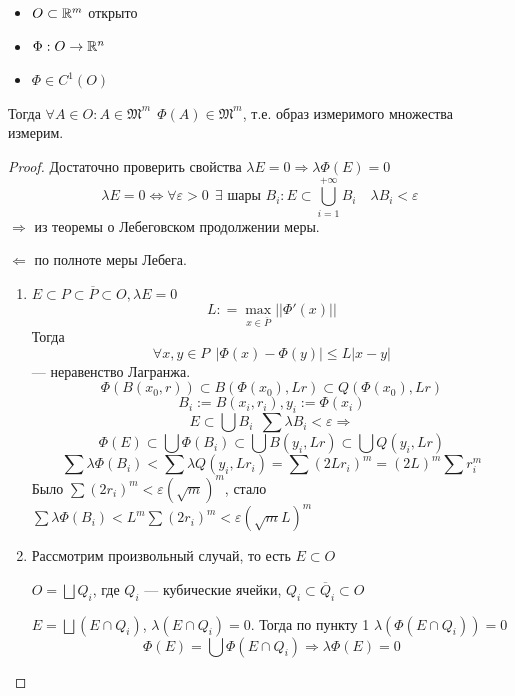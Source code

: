 \begin{theorem}\itemfix
    \begin{itemize}
        \item \(O\subset \mathbb{R}^m\) открыто
        \item \(\Phi: O \to \mathbb{R}^n\)
        \item \(\Phi\in C^1(O)\)
    \end{itemize}
    Тогда \(\forall A\in O : A \in \mathfrak{M}^m \ \ \Phi(A)\in \mathfrak{M}^m\), т.е. образ измеримого множества измерим.
\end{theorem}
\begin{proof}
    Достаточно проверить свойства \(\lambda E = 0 \Rightarrow \lambda \Phi(E) = 0\)
    \[\lambda E = 0 \Leftrightarrow \forall \varepsilon > 0 \ \ \exists \text{ шары } B_i : E \subset \bigcup_{i=1}^{+\infty} B_i \quad \lambda B_i < \varepsilon\]
    \( \Rightarrow \) из теоремы о Лебеговском продолжении меры.

    \( \Leftarrow \) по полноте меры Лебега.

    \begin{enumerate}
        \item \(E\subset P \subset \overline P \subset O, \lambda E = 0\)
              \[L : = \max_{x\in \overline P} | |\Phi'(x)| |\]
              Тогда
              \[\forall x, y\in P \ \ |\Phi(x) - \Phi(y)| \leq L|x - y|\]
              --- неравенство Лагранжа.
              \[\Phi(B(x_0, r)) \subset B(\Phi(x_0), Lr) \subset Q(\Phi(x_0), Lr)\]
              \[B_i := B(x_i, r_i), y_i := \Phi(x_i)\]
              \[E\subset \bigcup B_i \ \ \sum \lambda B_i < \varepsilon \Rightarrow\]
              \[\Phi(E) \subset \bigcup \Phi(B_i) \subset \bigcup B(y_i, Lr) \subset \bigcup Q(y_i, Lr)\]
              \[\sum \lambda \Phi(B_i) < \sum \lambda Q(y_i, Lr_i)  = \sum (2Lr_i)^m = (2L)^m \sum r_i^m\]
              Было \(\sum (2r_i)^m < \varepsilon (\sqrt{m})^m\), стало \(\sum \lambda \Phi(B_i) < L^m \sum (2r_i)^m < \varepsilon (\sqrt{m} L)^m\)
        \item Рассмотрим произвольный случай, то есть \(E\subset O\)

              \(O = \bigsqcup Q_i\), где \(Q_i\) --- кубические ячейки, \(Q_i \subset \overline Q_i \subset O\)

              \(E = \bigsqcup (E\cap Q_i)\), \(\lambda(E\cap Q_i) = 0\). Тогда по пункту 1 \(\lambda(\Phi(E\cap Q_i)) = 0\)
              \[\Phi(E) = \bigcup \Phi(E\cap Q_i) \Rightarrow \lambda \Phi(E) = 0\]
    \end{enumerate}
\end{proof}

